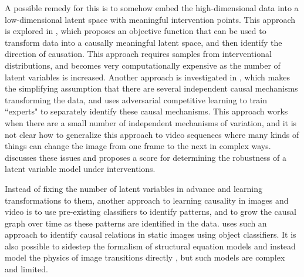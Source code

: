 \documentclass[letterpaper]{article} %
\begin{document}
A possible remedy for this is to somehow embed the high-dimensional data into a low-dimensional latent space with meaningful intervention points. This approach is explored in \cite{bengio2019meta}, which proposes an objective function that can be used to transform data into a causally meaningful latent space, and then identify the direction of causation. This approach requires samples from interventional distributions, and becomes very computationally expensive as the number of latent variables is increased. Another approach is investigated in \cite{parascandolo2017learning}, which makes the simplifying assumption that there are several independent causal mechanisms transforming the data, and uses adversarial competitive learning to train ``experts" to separately identify these causal mechanisms. This approach works when there are a small number of independent mechanisms of variation, and it is not clear how to generalize this approach to video sequences where many kinds of things can change the image from one frame to the next in complex ways. \cite{suter2018interventional} discusses these issues and proposes a score for determining the robustness of a latent variable model under interventions.

Instead of fixing the number of latent variables in advance and learning transformations to them, another approach to learning causality in images and video is to use pre-existing classifiers to identify patterns, and to grow the causal graph over time as these patterns are identified in the data. \cite{lopez2017discovering} uses such an approach to identify causal relations in static images using object classifiers. It is also possible to sidestep the formalism of structural equation models and instead model the physics of image transitions directly \cite{brubaker2009estimating} \cite{watter2015embed}, but such models are complex and limited.
\end{document}
